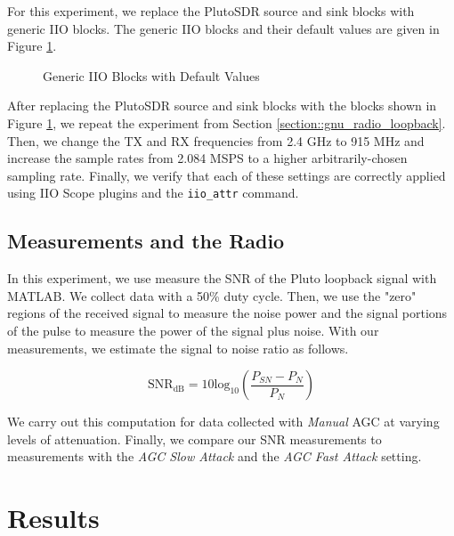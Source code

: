 \documentclass{article}
\begin{document}
For this experiment, we replace the PlutoSDR source and sink blocks with generic IIO blocks. The generic IIO blocks and their default values are given in Figure \ref{fig::generic_iio_blocks}.

\begin{figure}[H]
	\centerline{}
	\caption{Generic IIO Blocks with Default Values}
	\label{fig::generic_iio_blocks}
\end{figure}

After replacing the PlutoSDR source and sink blocks with the blocks shown in Figure \ref{fig::generic_iio_blocks}, we repeat the experiment from Section \ref{section::gnu_radio_loopback}. Then, we change the TX and RX frequencies from 2.4 GHz to 915 MHz and increase the sample rates from 2.084 MSPS to a higher arbitrarily-chosen sampling rate. Finally, we verify that each of these settings are correctly applied using IIO Scope plugins and the \texttt{iio\_attr} command. 

\subsection{Measurements and the Radio}
\label{section::snr_measurement}

In this experiment, we use measure the SNR of the Pluto loopback signal with MATLAB. We collect data with a 50\% duty cycle. Then, we use the "zero" regions of the received signal to measure the noise power and the signal portions of the pulse to measure the power of the signal plus noise. With our measurements, we estimate the signal to noise ratio as follows.

\begin{equation*}
	\text{SNR}_\text{dB} = 10\text{log}_{10}\left(\frac{P_{SN} - P_{N}}{P_{N}}\right)
	\label{eq::snr_estimate}
\end{equation*}

We carry out this computation for data collected with \textit{Manual} AGC at varying levels of attenuation. Finally, we compare our SNR measurements to measurements with the \textit{AGC Slow Attack} and the \textit{AGC Fast Attack} setting.

\section{Results}
\end{document}
